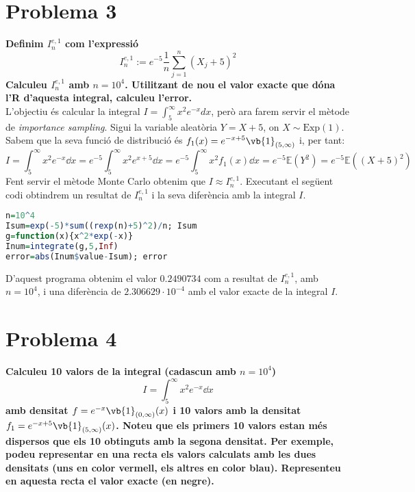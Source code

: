 \documentclass[11pt,a4paper]{article}
\begin{document}
\section*{Problema 3}
\textbf{Definim $I_n^{e,1}$ com l'expressió}
$$I_n^{e,1}:=e^{-5}\frac{1}{n}\sum_{j=1}^n \left(X_j+5\right)^2$$
\textbf{Calculeu $I_n^{e,1}$ amb $n=10^4$. Utilitzant de nou el valor exacte que dóna l'R d'aquesta integral, calculeu l'error.}\\
L'objectiu és calcular la integral $\displaystyle I=\int_5^{\infty}x^2e^{-x}dx$, però ara farem servir el mètode de \textit{importance sampling}. Sigui la variable aleatòria $Y=X+5$, on $X\sim \text{Exp}(1)$. Sabem que la seva funció de distribució és $\displaystyle f_1(x)=e^{-x+5}\vb{1}_{(5,\infty)}$ i, per tant:
$$I=\int_5^{\infty}x^2e^{-x}\dd x=e^{-5}\int_5^{\infty}x^2e^{x+5}\dd x=e^{-5}\int_5^{\infty}x^2f_1(x)\dd x=e^{-5}\mathbb{E}(Y^2)=e^{-5}\mathbb{E}({(X+5)}^2)$$
Fent servir el mètode Monte Carlo obtenim que $I\approx I_n^{e,1}$. Executant el següent codi obtindrem un resultat de $I_n^{e,1}$ i la seva diferència amb la integral $I$.
\newpage
\begin{lstlisting}[language=R, caption={Programa del problema 3},xleftmargin=.22\textwidth,xrightmargin=.22\textwidth]
n=10^4
Isum=exp(-5)*sum((rexp(n)+5)^2)/n; Isum
g=function(x){x^2*exp(-x)}
Inum=integrate(g,5,Inf)
error=abs(Inum$value-Isum); error
\end{lstlisting}
D'aquest programa obtenim el valor $0.2490734$ com a resultat de $I_n^{e,1}$, amb $n=10^4$, i una diferència de $2.306629\cdot 10^{-4}$ amb el valor exacte de la integral $I$.

\section*{Problema 4}
\textbf{Calculeu 10 valors de la integral (cadascun amb $n=10^4$) $$I=\int_5^\infty x^2e^{-x}\dd x$$ amb densitat $f=e^{-x}\vb{1}_{(0,\infty)}(x)$ i 10 valors amb la densitat $f_1=e^{-x+5}\vb{1}_{(5,\infty)}(x)$. Noteu que els primers 10 valors estan més dispersos que els 10 obtinguts amb la segona densitat. Per exemple, podeu representar en una recta els valors calculats amb les dues densitats (uns en color vermell, els altres en color blau). Representeu en aquesta recta el valor exacte (en negre).}
\end{document}
